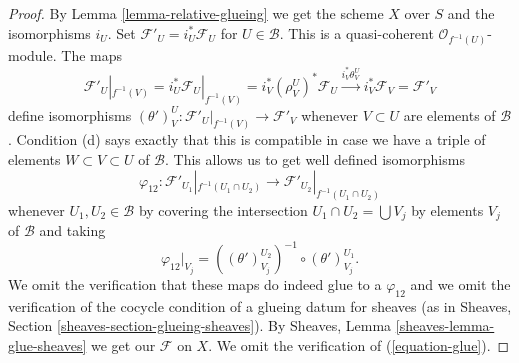 \documentclass{stacks-project}
\theoremstyle{plain}
\theoremstyle{definition}
\theoremstyle{remark}
\numberwithin{equation}{subsection}
\begin{document}
\begin{proof}
By Lemma \ref{lemma-relative-glueing} we get the scheme $X$ over $S$
and the isomorphisms $i_U$.
Set $\mathcal{F}'_U = i_U^*\mathcal{F}_U$ for $U \in \mathcal{B}$.
This is a quasi-coherent $\mathcal{O}_{f^{-1}(U)}$-module.
The maps
$$
\mathcal{F}'_U|_{f^{-1}(V)} =
i_U^*\mathcal{F}_U|_{f^{-1}(V)} =
i_V^*(\rho^U_V)^*\mathcal{F}_U \xrightarrow{i_V^*\theta^U_V}
i_V^*\mathcal{F}_V = \mathcal{F}'_V
$$
define isomorphisms
$(\theta')^U_V : \mathcal{F}'_U|_{f^{-1}(V)} \to \mathcal{F}'_V$
whenever $V \subset U$ are elements of $\mathcal{B}$.
Condition (d) says exactly that this is compatible in case
we have a triple of elements $W \subset V \subset U$ of $\mathcal{B}$.
This allows us to get well defined isomorphisms
$$
\varphi_{12} :
\mathcal{F}'_{U_1}|_{f^{-1}(U_1 \cap U_2)}
\longrightarrow
\mathcal{F}'_{U_2}|_{f^{-1}(U_1 \cap U_2)}
$$
whenever $U_1, U_2 \in \mathcal{B}$ by covering the intersection
$U_1 \cap U_2 = \bigcup V_j$ by elements $V_j$ of $\mathcal{B}$
and taking
$$
\varphi_{12}|_{V_j} =
\left((\theta')^{U_2}_{V_j}\right)^{-1}
\circ
(\theta')^{U_1}_{V_j}.
$$
We omit the verification that these maps do indeed glue to a
$\varphi_{12}$ and we omit the verification of the
cocycle condition of a glueing datum for sheaves
(as in Sheaves, Section \ref{sheaves-section-glueing-sheaves}).
By Sheaves, Lemma \ref{sheaves-lemma-glue-sheaves}
we get our $\mathcal{F}$ on $X$. We omit the verification
of (\ref{equation-glue}).
\end{proof}
\end{document}
